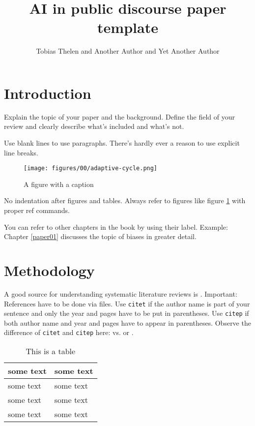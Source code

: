 \documentclass[output=paper]{langscibook}
\author{Tobias Thelen and Another Author and Yet Another Author}
\title{AI in public discourse paper template}
\begin{document}
\maketitle
\section{Introduction}
 
Explain the topic of your paper and the background. Define the field of your review and clearly describe what's included and what's not.

Use blank lines to use paragraphs. There's hardly ever a reason to use explicit line breaks.

\begin{figure}[ht]
	\centering
  \texttt{[image: figures/00/adaptive-cycle.png]}
	\caption{A figure with a caption \citep{parasuraman_model_2000}}
	\label{fig:00-adaptive-cycle}
\end{figure}

\noindent No indentation after figures and tables. Always refer to figures like figure \ref{fig:00-adaptive-cycle} with proper ref commands.

You can refer to other chapters in the book by using their label. Example: Chapter \ref{paper01} discusses the topic of biases in greater detail.


 \section{Methodology}
 
 A good source for understanding systematic literature reviews is \citet{zawacki2019systematic}. Important: References have to be done via \BibTeX files. Use \texttt{citet} if the author name is part of your sentence and only the year and pages have to be put in parentheses. Use \texttt{citep} if both author name and year and pages have to appear in parentheses. Observe the difference of \texttt{citet} and \texttt{citep} here: \citet{zawacki2019systematic} vs. \citep{zawacki2019systematic} or \citep{andre2017}.

 \begin{table}[ht]
    \centering
    \begin{tabular}{p{}p{}}
    \hline
      some text & some text \\
    \hline
      some text & some text \\
      some text & some text \\
      some text & some text \\
    \hline
    \end{tabular}
    \caption{This is a table}
    \label{tab:00-search-terms}
\end{table}
\end{document}

